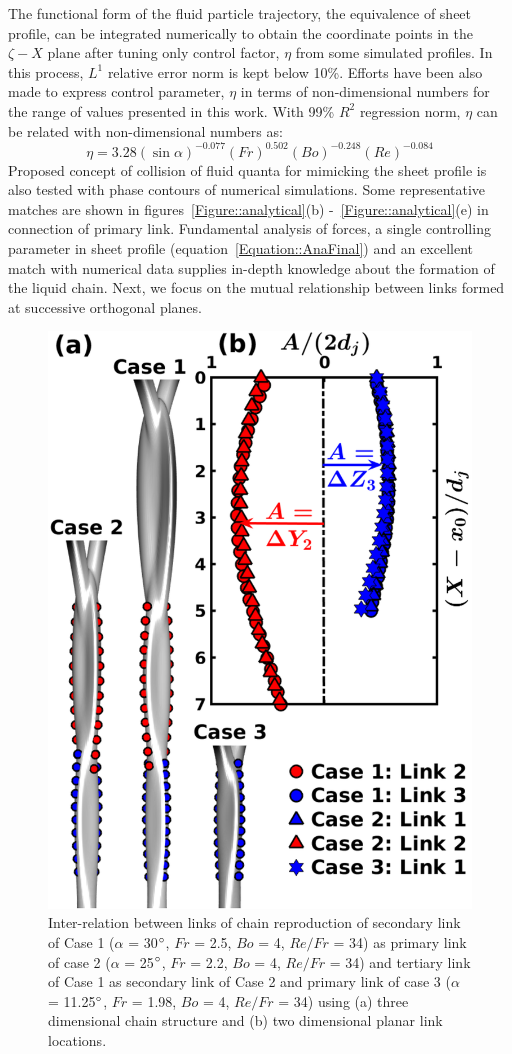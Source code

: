 The functional form of the fluid particle trajectory, the equivalence of sheet profile, can be integrated numerically to obtain the coordinate points in the $\zeta-X$ plane after tuning only control factor, $\eta$ from some simulated profiles. In this process, $L^1$ relative error norm is kept below 10\%. Efforts have been also made to express control parameter, $\eta$ in terms of non-dimensional numbers for the range of values presented in this work. With 99\% $R^2$ regression norm, $\eta$ can be related with non-dimensional numbers as:
\begin{equation}\label{Equation::eta}
\eta = 3.28(\sin\alpha)^{-0.077}(Fr)^{0.502}(Bo)^{-0.248}\left(Re\right)^{-0.084}
\end{equation}
Proposed concept of collision of fluid quanta for mimicking the sheet profile is also tested with phase contours of numerical simulations. Some representative matches are shown in figures~\ref{Figure::analytical}(b) -~\ref{Figure::analytical}(e) in connection of primary link. Fundamental analysis of forces, a single controlling parameter in sheet profile (equation~\ref{Equation::AnaFinal}) and an excellent match with numerical data supplies in-depth knowledge about the formation of the liquid chain. Next, we focus on the mutual relationship between links formed at successive orthogonal planes. 
\begin{figure}[h]
	\centering
	\includegraphics[width=0.45\linewidth]{chapters/Figure11}
	\caption{Inter-relation between links of chain reproduction of secondary link of Case 1 ($\alpha$ = 30$\degree$, $Fr$ = 2.5, $Bo$ = 4, $Re/Fr$ = 34) as primary link of case 2 ($\alpha$ = 25$\degree$, $Fr$ = 2.2, $Bo$ = 4, $Re/Fr$ = 34) and tertiary link of Case 1 as secondary link of Case 2 and primary link of case 3 ($\alpha$ = 11.25$\degree$, $Fr$ = 1.98, $Bo$ = 4, $Re/Fr$ = 34) using (a) three dimensional chain structure and (b) two dimensional planar link locations.}
	\label{Figure::secondCollision}
\end{figure}
